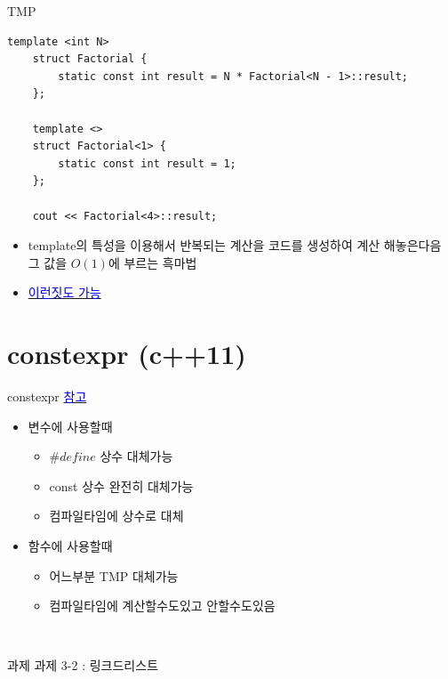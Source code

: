 \documentclass[10pt]{beamer}
\begin{document}
\begin{frame}[fragile]{TMP}
    
    \begin{lstlisting}[style = CppStyle]
    template <int N>
    struct Factorial {
        static const int result = N * Factorial<N - 1>::result;
    };

    template <>
    struct Factorial<1> {
        static const int result = 1;
    };

    cout << Factorial<4>::result; 
    \end{lstlisting}
    
    \begin{itemize}
        \item template의 특성을 이용해서 반복되는 계산을 코드를 생성하여 계산 해놓은다음 그 값을 $O(1)$에 부르는 흑마법
        \item \href{https://libsora.so/posts/friday-the-13th-tmp/}{\textcolor{blue}{이런짓도 가능}}
    \end{itemize}
\end{frame}    


\section{constexpr (c++11)}

\begin{frame}[fragile]{constexpr}
    \href{https://youtu.be/o9FXctFYlnY}{\textcolor{blue}{참고}}
    \begin{itemize}
        \item 변수에 사용할때
        \begin{itemize}
            \item $\#define$ 상수 대체가능
            \item const 상수 완전히 대체가능
            \item 컴파일타임에 상수로 대체
        \end{itemize}
        \item 함수에 사용할때
        \begin{itemize}
            \item 어느부분 TMP 대체가능
            \item 컴파일타임에 계산할수도있고 안할수도있음
        \end{itemize}
    \end{itemize}
\end{frame} 


\begin{frame}[fragile]{}
        
    \begin{lstlisting}[style = CppStyle]
    
    \end{lstlisting}

\end{frame}





\begin{frame}{과제}
    과제 3-2 : 링크드리스트
\end{frame}    
\end{document}
